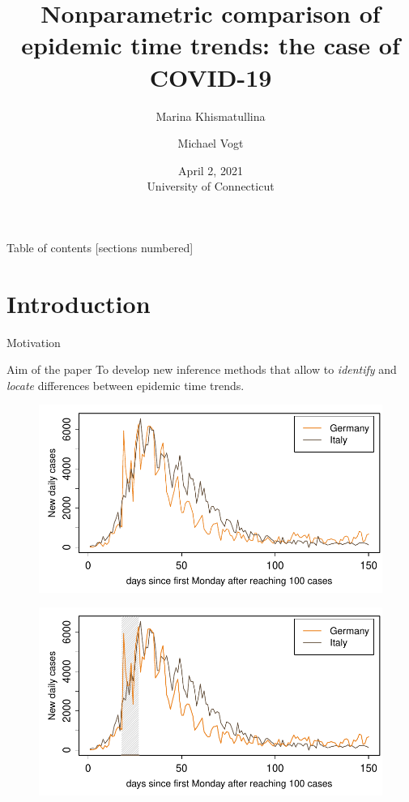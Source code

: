 \documentclass[10pt, handout]{beamer}
\title{Nonparametric comparison of epidemic time trends: the case of COVID-19}
\date{April 2, 2021\\ University of Connecticut}
\author{Marina Khismatullina \and Michael Vogt}
\begin{document}
\maketitle

\begin{frame}{Table of contents}
  [sections numbered]
  \tableofcontents[hideallsubsections]
\end{frame}

\section{Introduction}


\begin{frame}{Motivation}

{ \begin{block}{Aim of the paper}
	To develop new inference methods that allow to \textit{identify} and \textit{locate} differences between epidemic time trends.
\end{block}}
	{\begin{figure}
    		\centering
    		\includegraphics[height=0.45\textheight]{plots/Germany_and_Italy.pdf}
  	\end{figure}}
	{\onslide<3>
	\vspace{-46,81mm}
	\begin{figure}
    		\centering
    		\includegraphics[height=0.45\textheight]{plots/Germany_and_Italy_1.pdf}

\end{figure}}
\end{frame}
\end{document}
